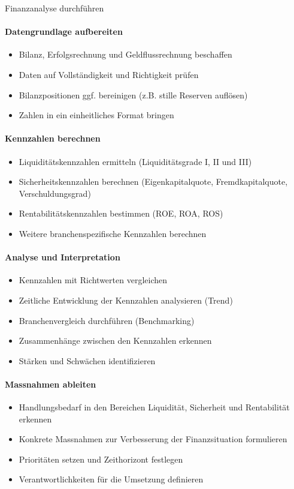\begin{KR}{Finanzanalyse durchführen}\\
\paragraph{Datengrundlage aufbereiten}
\begin{itemize}
    \item Bilanz, Erfolgsrechnung und Geldflussrechnung beschaffen
    \item Daten auf Vollständigkeit und Richtigkeit prüfen
    \item Bilanzpositionen ggf. bereinigen (z.B. stille Reserven auflösen)
    \item Zahlen in ein einheitliches Format bringen
\end{itemize}

\paragraph{Kennzahlen berechnen}
\begin{itemize}
    \item Liquiditätskennzahlen ermitteln (Liquiditätsgrade I, II und III)
    \item Sicherheitskennzahlen berechnen (Eigenkapitalquote, Fremdkapitalquote, Verschuldungsgrad)
    \item Rentabilitätskennzahlen bestimmen (ROE, ROA, ROS)
    \item Weitere branchenspezifische Kennzahlen berechnen
\end{itemize}

\paragraph{Analyse und Interpretation}
\begin{itemize}
    \item Kennzahlen mit Richtwerten vergleichen
    \item Zeitliche Entwicklung der Kennzahlen analysieren (Trend)
    \item Branchenvergleich durchführen (Benchmarking)
    \item Zusammenhänge zwischen den Kennzahlen erkennen
    \item Stärken und Schwächen identifizieren
\end{itemize}

\paragraph{Massnahmen ableiten}
\begin{itemize}
    \item Handlungsbedarf in den Bereichen Liquidität, Sicherheit und Rentabilität erkennen
    \item Konkrete Massnahmen zur Verbesserung der Finanzsituation formulieren
    \item Prioritäten setzen und Zeithorizont festlegen
    \item Verantwortlichkeiten für die Umsetzung definieren
\end{itemize}
\end{KR}

